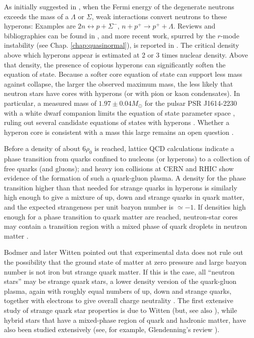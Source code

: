\documentclass[12pt]{article}
\begin{document}
As initially suggested in \cite{AS60}, when the
Fermi energy of the degenerate neutrons exceeds the mass of a $\Lambda$
or $\Sigma$, weak interactions convert neutrons to these hyperons:
Examples are $2n\leftrightarrow p+\Sigma^-$, $n+p^+\rightarrow
p^++\Lambda$.   Reviews and bibliographies can be found in \cite{Glendenning97,BG97,P97}, and 
more recent work, spurred by the $r$-mode instability (see Chap. \ref{chap:quasinormal}),
is reported in \cite{Lindblom01,Haensel02,Lackey2006}. 
 The critical density above which hyperons appear is 
estimated at 2 or 3 times nuclear density.  Above that density, the presence
of copious hyperons can significantly soften the equation of state.  Because a 
softer core equation of state can support less mass against collapse, the 
larger the observed maximum mass, the less likely that neutron stars 
have cores with hyperons (or with pion or kaon condensates).  In particular, 
a measured mass of  $1.97\pm0.04 M_\odot$ for the pulsar PSR J1614-2230 
with a white dwarf companion \cite{demorest10} limits the equation of state 
parameter space \cite{rlof09}, ruling out several candidate equations of 
states with hyperons \cite{ozel10}.   Whether a hyperon core is consistent 
with a mass this large remains an open question \cite{stone10}.  


\vskip0.8cm

Before a density of about 6$\rho_0$ is reached, lattice QCD
calculations indicate a phase transition from quarks confined to
nucleons (or hyperons) to a collection of free quarks (and gluons); and
heavy ion collisions at CERN and RHIC show evidence of the formation of
such a quark-gluon plasma. A density for the phase transition 
higher than that needed for strange quarks in hyperons is similarly high 
enough to give a mixture of up, down and strange quarks in quark matter, 
and the expected strangeness per unit baryon number is $\simeq -1$.  
If densities high enough for a phase transition to quark matter are 
reached, neutron-star cores may contain a transition region with a 
mixed phase of quark droplets in neutron matter \cite{Glendenning97}.   

Bodmer \cite{Bodmer71} and later Witten \cite{Witten84}  
pointed out that experimental data does not rule out the possibility
that the  ground state of matter at zero pressure and large baryon number
is not iron but strange quark matter.  If this is the case, all 
``neutron stars'' may be strange quark stars, a lower density version 
of the quark-gluon plasma, again with roughly equal numbers of 
up, down and strange quarks, together with electrons to give 
overall charge neutrality \cite{Bodmer71,Farhi84}.  The first extensive
study of strange quark star properties is due to Witten
\cite{Witten84} (but, see also \cite{Ipser75,Brecher76}), while 
hybrid stars that have a mixed-phase region of quark and 
hadronic matter, have also been studied extensively (see, for example,
Glendenning's review \cite{Glendenning97}).
\end{document}
